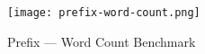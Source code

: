 \begin{figure}[H]
    \centering
    \texttt{[image: prefix-word-count.png]}
    \caption{Prefix --- Word Count Benchmark}\label{fig:prefix_word_count_bm}
\end{figure}